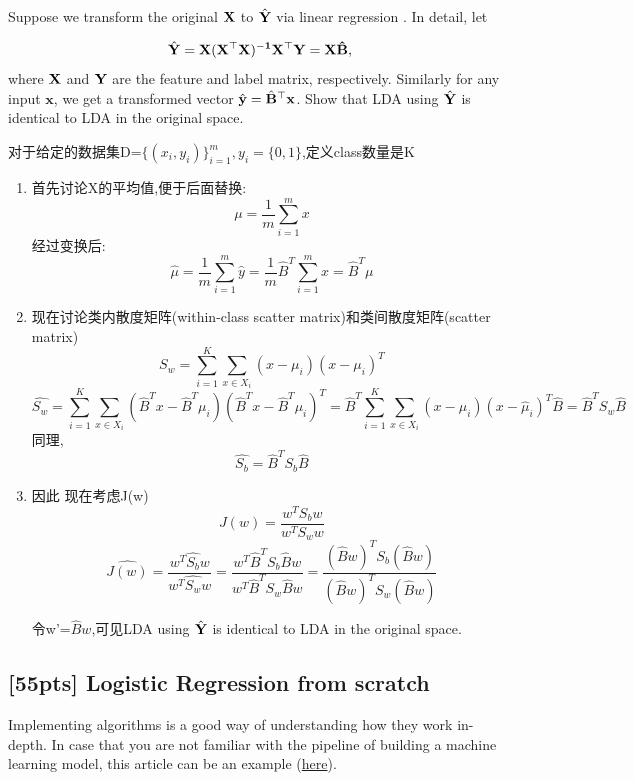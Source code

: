 \documentclass[11pt, a4paper, UTF8]{ctexart}
\begin{document}
\begin{problem}[ML problem 2]
	
Suppose we transform the original $\bf X$ to $\hat{\bf Y}$ via linear regression . In detail, let 

\begin{equation*}
\hat{\bf Y} = \bf X(\bf X^{\top} \bf X)^{-1}\bf X^{\top}\bf Y = \bf X\hat{\bf B},
\end{equation*}
where $\bf X$ and $\bf Y$ are the feature and label matrix, respectively.
Similarly for any input $\mathbf{x}$, we get a transformed vector $\hat{\mathbf{y}} = \hat{\bf B}^{\top}\mathbf{x}$. Show that LDA using $\hat{\bf Y}$ is identical to LDA in the original space.

\end{problem}
\begin{solution}
	对于给定的数据集D=$\{(x_i,y_i)\}_{i=1}^{m},y_i=\{0,1\}$,定义class数量是K
  \begin{enumerate}
  	\item 首先讨论X的平均值,便于后面替换:$$\mu=\frac{1}{m}\sum_{i=1}^{m}x$$
  	经过变换后:$$\hat{\mu}=\frac{1}{m}\sum_{i=1}^{m}\hat{y}=\frac{1}{m}\hat{B}^{T}\sum_{i=1}^{m}x=\hat{B}^{T}\mu$$
  	\item 现在讨论类内散度矩阵(within-class scatter matrix)和类间散度矩阵(scatter matrix)
  	$$S_w=\sum _{i=1}^{K} \sum _{x\in X_i}(x-\mu _i)(x-\mu _i)^{T}$$
  	$$\hat{S_w}=\sum _{i=1}^{K} \sum _{x\in X_i}(\hat{B}^{T}x-\hat{B}^{T}\mu _i)(\hat{B}^{T}x-\hat{B}^{T}\mu _i)^{T}=\hat{B}^{T}\sum _{i=1}^{K} \sum _{x\in X_i}(x-\mu _i)(x-\hat\mu _i)^{T}\hat{B}=\hat{B}^{T}S_w\hat{B}$$
  	同理,$$\hat{S_b}=\hat{B}^{T}S_b\hat{B}$$
  	\item 因此 现在考虑J(w)
  	$$J(w)=\frac{w^TS_bw}{w^TS_ww}$$
  	$$\hat{J(w)}=\frac{w^T\hat{S_b}w}{w^T\hat{S_w}w}=\frac{w^T\hat{B}^TS_b\hat{B}w}{w^T\hat{B}^TS_w\hat{B}w}=\frac{(\hat{B}w)^TS_b(\hat{B}w)}{(\hat{B}w)^TS_w(\hat{B}w)}$$
  	
  	令w'=$\hat{B}w$,可见LDA using $\hat{\bf Y}$ is identical to LDA in the original space.
  \end{enumerate}
\end{solution}

\begin{problem}[ML problem 3]
\end{problem}
\subsection{[55pts] Logistic Regression from scratch  }
Implementing algorithms is a good way of understanding how they work in-depth. In case that you are not familiar with the pipeline of building a machine learning model, this article can be an example (\href{https://www.jianshu.com/p/ecb89148ed64}{here}).
\end{document}
